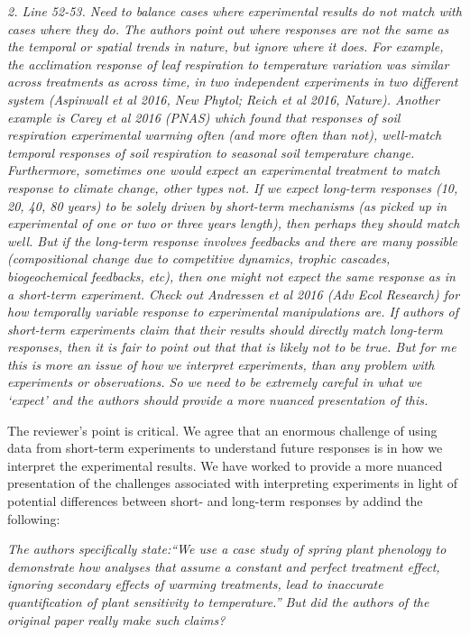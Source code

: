 \documentclass[11pt,a4paper]{letter}
\begin{document}
\begin{letter}{}
\emph{2. Line 52-53. Need to balance cases where experimental results do not match with cases where they do. The authors point out where responses are not the same as the temporal or spatial trends in nature, but ignore where it does. For example, the acclimation response of leaf respiration to temperature variation was similar across treatments as across time, in two independent experiments in two different system (Aspinwall et al 2016, New Phytol; Reich et al 2016, Nature). Another example is Carey et al 2016 (PNAS) which found that responses of soil respiration experimental warming often (and more often than not), well-match temporal responses of soil respiration to seasonal soil temperature change. Furthermore, sometimes one would expect an experimental treatment to match response to climate change, other types not. If we expect long-term responses (10, 20, 40, 80 years) to be solely driven by short-term mechanisms (as picked up in experimental of one or two or three years length), then perhaps they should match well. But if the long-term response involves feedbacks and there are many possible (compositional change due to competitive dynamics, trophic cascades, biogeochemical feedbacks, etc), then one might not expect the same response as in a short-term experiment. Check out Andressen et al 2016 (Adv Ecol Research) for how temporally variable response to experimental manipulations are. If authors of short-term
experiments claim that their results should directly match long-term responses, then it is fair to point out that that is likely not to be true. But for me this is more an issue of how we interpret experiments, than any problem with experiments or observations. So we need to be extremely careful in what we `expect' and the authors should provide a more nuanced presentation of this.}

The reviewer's point is critical. We agree that an enormous challenge of using data from short-term experiments to understand future responses is in how we interpret the experimental results. We have worked to provide a more nuanced presentation of the challenges associated with interpreting experiments in light of potential differences between short- and long-term responses by addind the following:


\emph{The authors specifically state:``We use a case study of spring plant phenology to demonstrate how analyses that assume a constant and perfect treatment effect, ignoring secondary effects of warming treatments, lead to inaccurate quantification of plant sensitivity to temperature.'' But did the authors of the original paper really make such claims?}


\end{letter}
\end{document}
